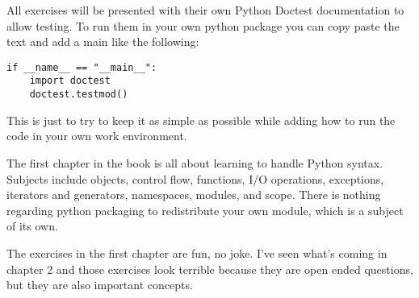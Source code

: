 
All exercises will be presented with their own Python Doctest documentation to allow testing. To run them in your own python package you can copy paste the text and add a main like the following:

\begin{lstlisting}[title=Running Doctest]
if __name__ == "__main__":
    import doctest
    doctest.testmod()
\end{lstlisting}

This is just to try to keep it as simple as possible while adding how to run the code in your own work environment.






The first chapter in the book is all about learning to handle Python syntax. Subjects include objects, control flow, functions, I/O operations, exceptions, iterators and generators, namespaces, modules, and scope. There is nothing regarding python packaging to redistribute your own module, which is a subject of its own. 

\label{ssec:Exercises}

The exercises in the first chapter are fun, no joke. I've seen what's coming in chapter 2 and those exercises look terrible because they are open ended questions, but they are also important concepts.  






